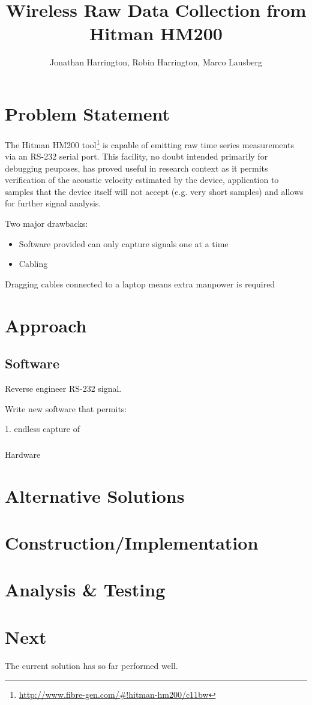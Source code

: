 \documentclass[a4paper, 11pt]{article}
\title{Wireless Raw Data Collection from Hitman HM200}
\author{Jonathan Harrington, Robin Harrington, Marco Lausberg}
\begin{document}
\maketitle
\noindent

\section*{Problem Statement}

The Hitman HM200 tool\footnote{\url{http://www.fibre-gen.com/#!hitman-hm200/c11bw}} is capable of emitting raw time series measurements via an RS-232 serial port. This facility, no doubt intended primarily for debugging peuposes, has proved useful in research context as it permits verification of the acoustic velocity estimated by the device, application to samples that the device itself will not accept (e.g. very short samples) and allows for further signal analysis.

Two major drawbacks:

\begin{itemize}
\item Software provided can only capture signals one at a time 
\item Cabling
\end{itemize}

Dragging cables connected to a laptop means extra manpower is required


\section*{Approach}

\subsection*{Software}

Reverse engineer RS-232 signal.

Write new software that permits:

1. endless capture of 



\subsubsection{}{Hardware}

\section*{Alternative Solutions}
\lipsum[3]

\section*{Construction/Implementation}
\lipsum[5]

\section*{Analysis \& Testing}
\lipsum[6]

\section*{Next}

The current solution has so far performed well. 
\end{document}
